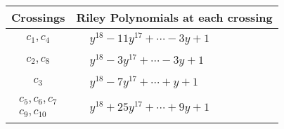 \documentclass[1p]{elsarticle_modified}
\theoremstyle{definition}
\begin{document}
\begin{tabular}{m{50pt}|m{274pt}}
Crossings & \hspace{64pt}Riley Polynomials at each crossing \\
\hline $$\begin{aligned}c_{1},c_{4}\end{aligned}$$&$\begin{aligned}
&y^{18}-11 y^{17}+\cdots-3 y+1
\end{aligned}$\\
\hline $$\begin{aligned}c_{2},c_{8}\end{aligned}$$&$\begin{aligned}
&y^{18}-3 y^{17}+\cdots-3 y+1
\end{aligned}$\\
\hline $$\begin{aligned}c_{3}\end{aligned}$$&$\begin{aligned}
&y^{18}-7 y^{17}+\cdots+y+1
\end{aligned}$\\
\hline $$\begin{aligned}c_{5},c_{6},c_{7}\\c_{9},c_{10}\end{aligned}$$&$\begin{aligned}
&y^{18}+25 y^{17}+\cdots+9 y+1
\end{aligned}$\\
\hline
\end{tabular}
\vskip 2pc
\end{document}
